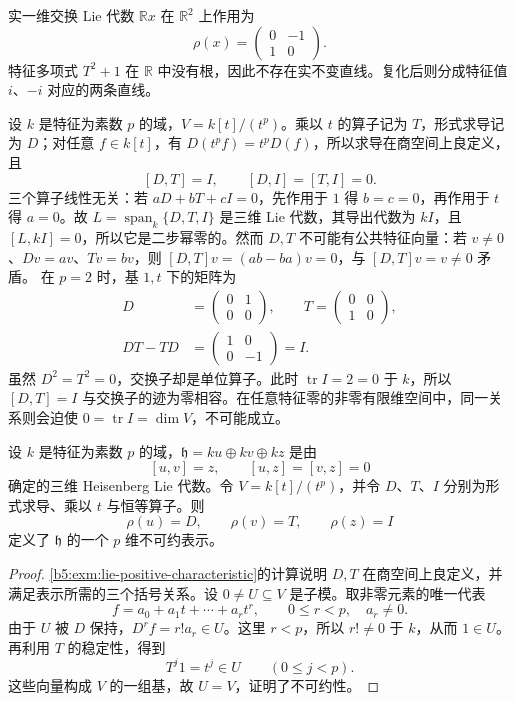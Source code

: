 \begin{example}\label{b5:exm:lie-real-failure}
	实一维交换 Lie 代数 \(\mathbb Rx\) 在 \(\mathbb R^2\) 上作用为
	\[
		\rho(x)=\begin{pmatrix}0&-1\\1&0\end{pmatrix}.
	\]
	特征多项式 \(T^2+1\) 在 \(\mathbb R\) 中没有根，因此不存在实不变直线。复化后则分成特征值 \(i\)、\(-i\) 对应的两条直线。
\end{example}

\begin{example}\label{b5:exm:lie-positive-characteristic}
	设 \(k\) 是特征为素数 \(p\) 的域，\(V=k[t]/(t^p)\)。乘以 \(t\) 的算子记为 \(T\)，形式求导记为 \(D\)；对任意 \(f\in k[t]\)，有 \(D(t^pf)=t^pD(f)\)，所以求导在商空间上良定义，且
	\[
		[D,T]=I,\qquad[D,I]=[T,I]=0.
	\]
	三个算子线性无关：若 \(aD+bT+cI=0\)，先作用于 \(1\) 得 \(b=c=0\)，再作用于 \(t\) 得 \(a=0\)。故 \(L=\operatorname{span}_k\{D,T,I\}\) 是三维 Lie 代数，其导出代数为 \(kI\)，且 \([L,kI]=0\)，所以它是二步幂零的。然而 \(D,T\) 不可能有公共特征向量：若 \(v\ne0\)、\(Dv=av\)、\(Tv=bv\)，则 \([D,T]v=(ab-ba)v=0\)，与 \([D,T]v=v\ne0\) 矛盾。 在 \(p=2\) 时，基 \(1,t\) 下的矩阵为
	\[
		\begin{aligned}
			D&=\begin{pmatrix}0&1\\0&0\end{pmatrix},\qquad
			T=\begin{pmatrix}0&0\\1&0\end{pmatrix},
			\\
			DT-TD&=\begin{pmatrix}1&0\\0&-1\end{pmatrix}=I.
		\end{aligned}
	\]
	虽然 \(D^2=T^2=0\)，交换子却是单位算子。此时 \(\operatorname{tr}I=2=0\) 于 \(k\)，所以 \([D,T]=I\) 与交换子的迹为零相容。在任意特征零的非零有限维空间中，同一关系则会迫使 \(0=\operatorname{tr}I=\dim V\)，不可能成立。
\end{example}

\begin{proposition}\label{b5:prop:positive-heisenberg-irreducible}
	设 \(k\) 是特征为素数 \(p\) 的域，\(\mathfrak h=ku\oplus kv\oplus kz\) 是由
	\[
		[u,v]=z,\qquad[u,z]=[v,z]=0
	\]
	确定的三维 Heisenberg Lie 代数。令 \(V=k[t]/(t^p)\)，并令 \(D\)、\(T\)、\(I\) 分别为形式求导、乘以 \(t\) 与恒等算子。则
	\[
		\rho(u)=D,\qquad\rho(v)=T,\qquad\rho(z)=I
	\]
	定义了 \(\mathfrak h\) 的一个 \(p\) 维不可约表示。
\end{proposition}
\begin{proof}
	\cref{b5:exm:lie-positive-characteristic}的计算说明 \(D,T\) 在商空间上良定义，并满足表示所需的三个括号关系。设 \(0\ne U\subseteq V\) 是子模。取非零元素的唯一代表
	\[
		f=a_0+a_1t+\cdots+a_rt^r,\qquad 0\le r<p,\quad a_r\ne0.
	\]
	由于 \(U\) 被 \(D\) 保持，\(D^rf=r!a_r\in U\)。这里 \(r<p\)，所以 \(r!\ne0\) 于 \(k\)，从而 \(1\in U\)。再利用 \(T\) 的稳定性，得到
	\[
		T^j1=t^j\in U\qquad(0\le j<p).
	\]
	这些向量构成 \(V\) 的一组基，故 \(U=V\)，证明了不可约性。
\end{proof}

